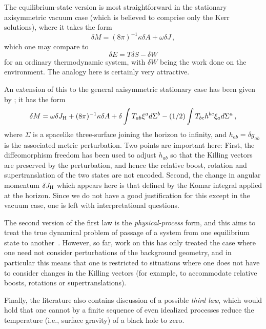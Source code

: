 \documentclass[
%
draft    %
,numberedheadings 
,bibliocites
  ]
  {aipproc}
\begin{document}
The equilibrium-state version is most straightforward in the stationary axisymmetric vacuum case (which is believed to comprise only the Kerr solutions), where it takes the form
\begin{equation}
\delta M=(8\pi )^{-1}\kappa\delta A +\omega\delta J\, ,
\end{equation}
which one may compare to
\begin{equation}
  \delta E=T\delta S -\delta W
\end{equation}
for an ordinary thermodynamic system, with $\delta W$ being the work done on the environment.  The analogy here is certainly very attractive.

An extension of this to the general axisymmetric stationary case has been given by \citet{Carter:1979}; it has the form
\begin{equation}  
  \delta M=\omega\delta J_{\rm H}+(8\pi )^{-1}\kappa \delta A
  +\delta\int T_{ab}\xi ^a d\Sigma ^b -(1/2)\int T_{bc} h^{bc} \xi _a d\Sigma ^a\, ,
\end{equation}
where $\Sigma$ is a spacelike three-surface joining the horizon to infinity, and $h_{ab}=\delta g_{ab}$ is the associated metric perturbation.  Two points are important here:  First, the diffeomorphism freedom has been used to adjust $h_{ab}$ so that the Killing vectors are preserved by the perturbation, and hence the relative boost, rotation and supertranslation of the two states are not encoded.  Second, the change in angular momentum $\delta J_{\rm H}$ which appears here is that defined by the Komar integral applied at the horizon.  Since we do not have a good justification for this except in the vacuum case, one is left with interpretational questions.

The second version of the first law is the {\em physical-process} form, and this aims to treat the true dynamical problem of passage of a system from one equilibrium state to another~\citep{Wald:1995yp,Gao:2001ut}.  However, so far, work on this has only treated the case where one need not consider perturbations of the background geometry, and in particular this means that one is restricted to situations where one does not have to consider changes in the Killing vectors (for example, to accommodate relative boosts, rotations or supertranslations).

Finally, the literature also contains discussion of a possible {\em third law}, which would hold
that one cannot by a finite sequence of even idealized processes reduce the temperature (i.e., surface gravity) of a black hole to zero.
\end{document}
